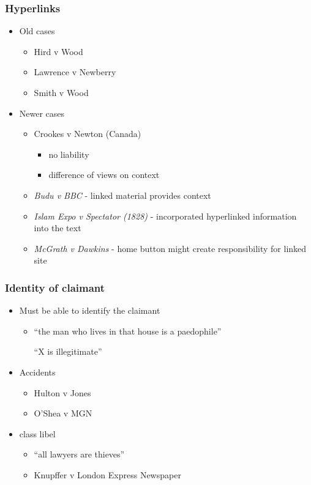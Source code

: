 \documentclass[ignorenonframetext,]{beamer}
\begin{document}

\begin{frame}
\frametitle{Hyperlinks}
\begin{itemize}
\item Old cases
  \begin{itemize}
  \item Hird v Wood
  \item Lawrence v Newberry
  \item Smith v Wood
  \end{itemize}
\item Newer cases
  \begin{itemize}
  \item Crookes v Newton (Canada)
    \begin{itemize}
    \item no liability
    \item difference of views on context
    \end{itemize}
  \item {\it Budu v BBC} - linked material provides context
  \item {\it Islam Expo v Spectator (1828)} - incorporated hyperlinked information into the text
  \item {\it McGrath v Dawkins} - home button might create responsibility for linked site
  \end{itemize}
\end{itemize}
\end{frame}

\begin{frame}
\frametitle{Identity of claimant}

\begin{itemize}
\item  Must be able to identify the claimant

  \begin{itemize}
  \item    ``the man who lives in that house is a paedophile''

    ``X is illegitimate''
  \end{itemize}
\item  Accidents

  \begin{itemize}
  \item    Hulton v Jones 
  \item    O'Shea v MGN
  \end{itemize}
\item  class libel 

  \begin{itemize}
  \item    ``all lawyers are thieves''
  \item    Knupffer v London Express Newspaper
  \end{itemize}
\end{itemize}

~


\end{frame}
\end{document}

